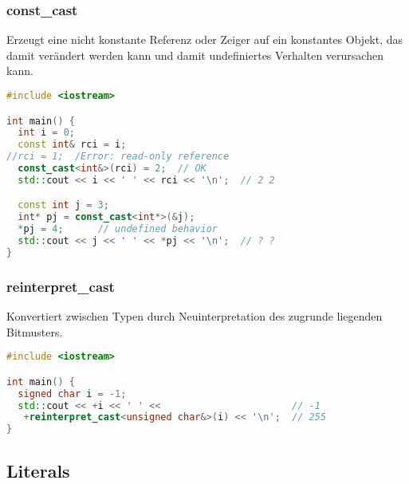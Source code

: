 \documentclass[10pt,twocolumn]{scrartcl}
\begin{document}
\subsubsection{const\_cast}
\label{sec:Conversion:constCast}

Erzeugt eine nicht konstante Referenz oder Zeiger auf ein konstantes Objekt, das
damit verändert werden kann und damit undefiniertes Verhalten verursachen kann.

\begin{lstlisting}[language=C++]
#include <iostream>

int main() {
  int i = 0;
  const int& rci = i;
//rci = 1;  /Error: read-only reference
  const_cast<int&>(rci) = 2;  // OK
  std::cout << i << ' ' << rci << '\n';  // 2 2

  const int j = 3;
  int* pj = const_cast<int*>(&j);
  *pj = 4;      // undefined behavior
  std::cout << j << ' ' << *pj << '\n';  // ? ?
}
\end{lstlisting}

\subsubsection{reinterpret\_cast}

Konvertiert zwischen Typen durch Neuinterpretation des zugrunde liegenden
Bitmusters.

\begin{lstlisting}[language=C++]
#include <iostream>

int main() {
  signed char i = -1;
  std::cout << +i << ' ' <<                       // -1
   +reinterpret_cast<unsigned char&>(i) << '\n';  // 255
}
\end{lstlisting}

\subsection{Literals}
\end{document}
